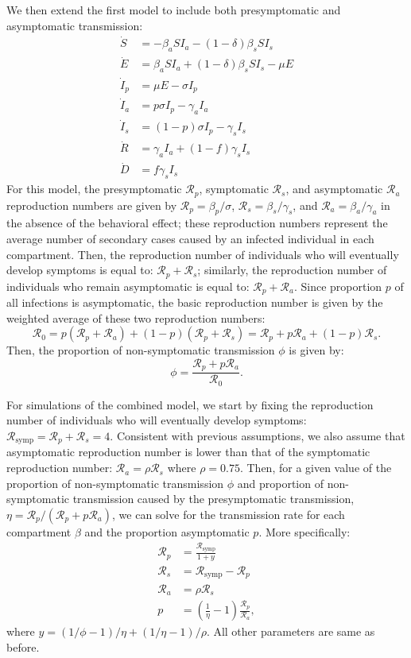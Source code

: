\documentclass[12pt]{article}
\newcommand{\RR}{\ensuremath{{\mathcal R}}\xspace}
\begin{document}
We then extend the first model to include both presymptomatic and asymptomatic transmission:
\begin{align}
\dot{S} &= -\beta_a S I_a -(1-\delta) \beta_s S I_s \\
\dot{E} &= \beta_a S I_a + (1-\delta) \beta_s S I_s - \mu E\\
\dot{I}_p &= \mu E - \sigma I_p\\
\dot{I}_a &= p \sigma I_p - \gamma_a I_a\\
\dot{I}_s &= (1-p) \sigma I_p -\gamma_s I_s\\
\dot{R} &= \gamma_a I_a + (1-f) \gamma_s I_s \\
\dot{D} &= f \gamma_s I_s
\end{align}
For this model, the presymptomatic $\RR_p$, symptomatic $\RR_s$, and asymptomatic $\RR_a$ reproduction numbers are given by $\RR_p = \beta_p/\sigma$, $\RR_s=\beta_s/\gamma_s$, and $\RR_a=\beta_a/\gamma_a$ in the absence of the behavioral effect;
these reproduction numbers represent the average number of secondary cases caused by an infected individual in each compartment.
Then, the reproduction number of individuals who will eventually develop symptoms is equal to: $\RR_p + \RR_s$;
similarly, the reproduction number of individuals who remain asymptomatic is equal to: $\RR_p + \RR_a$.
Since proportion $p$ of all infections is asymptomatic, the basic reproduction number is given by the weighted average of these two reproduction numbers: 
\begin{equation}
\RR_0 = p(\RR_p + \RR_a) + (1-p) (\RR_p + \RR_s) = \RR_p + p \RR_a + (1-p) \RR_s.
\end{equation}
Then, the proportion of non-symptomatic transmission $\phi$ is given by:
\begin{equation}
\phi = \frac{\RR_p + p \RR_a}{\RR_0}.
\end{equation}

For simulations of the combined model, we start by fixing the reproduction number of individuals who will eventually develop symptoms: $\RR_{\textrm{symp}} = \RR_p + \RR_s = 4$. 
Consistent with previous assumptions, we also assume that asymptomatic reproduction number is lower than that of the symptomatic reproduction number: $\RR_a = \rho \RR_s$ where $\rho = 0.75$.
Then, for a given value of the proportion of non-symptomatic transmission $\phi$ and proportion of non-symptomatic transmission caused by the presymptomatic transmission, $\eta = \RR_p/(\RR_p + p \RR_a)$, we can solve for the transmission rate for each compartment $\beta$ and the proportion asymptomatic $p$.
More specifically:
\begin{align}
\RR_p &= \frac{\RR_{\textrm{symp}}}{1 + y}\\
\RR_s &= \RR_{\textrm{symp}} - \RR_p\\
\RR_a &=  \rho \RR_s\\
p &= \left(\frac{1}{\eta} - 1 \right) \frac{\RR_p}{\RR_a},
\end{align}
where $y = (1/\phi - 1)/\eta + (1/\eta - 1)/\rho$.
All other parameters are same as before.
\end{document}
